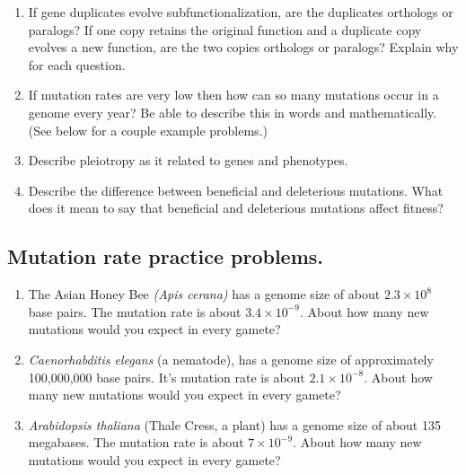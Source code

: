 \documentclass[letterpaper]{tufte-handout}
\begin{document}
\begin{enumerate}
	\item If gene duplicates evolve subfunctionalization, are the duplicates orthologs or paralogs? If one copy retains the original function and a duplicate copy evolves a new function, are the two copies orthologs or paralogs? Explain why for each question.
	
	\item If mutation rates are very low then how can so many mutations occur in a genome every year? Be able to describe this in words and mathematically. (See below for a couple example problems.) 
	
	\item Describe pleiotropy as it related to genes and phenotypes. 
	
	\item Describe the difference between beneficial and deleterious mutations. 	What does it mean to say that beneficial and deleterious mutations affect fitness?

\end{enumerate}

\subsection*{Mutation rate practice problems.}

\begin{enumerate}
\item The Asian Honey Bee \textit{(Apis cerana)} has a genome size of about $2.3 \times 10^{8}$ base pairs. The mutation rate is about $3.4 \times 10^{-9}.$ About how many new mutations would you expect in every gamete?

\item \textit{Caenorhabditis elegans} (a nematode), has a genome size of approximately 100,000,000 base pairs. It's mutation rate is about $2.1 \times 10^{-8}.$ About how many new mutations would you expect in every gamete?

\item \textit{Arabidopsis thaliana} (Thale Cress, a plant) has a genome size of about 135 megabases. The mutation rate is about $7 \times 10^{-9}.$ About how many new mutations would you expect in every gamete?

\end{enumerate}
\end{document}
